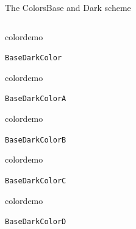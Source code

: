 \begin{frame}{The Colors}{Base and Dark scheme}
\begin{columns}
\begin{column}{0.45\textwidth}
\begin{beamercolorbox}[dp=0pt,sep=0em,wd=\bwidth,ht=\bheight]{}
\begin{beamercolorbox}[sep=0em,wd=\pdim,ht=\pdim]{colordemo}
\end{beamercolorbox}\quad\texttt{BaseDarkColor}\newline%
%
\begin{beamercolorbox}[sep=0em,wd=\pdim,ht=\pdim]{colordemo}
\end{beamercolorbox}\quad\texttt{BaseDarkColorA}\hfill\newline%
%
\begin{beamercolorbox}[sep=0em,wd=\pdim,ht=\pdim]{colordemo}%
\end{beamercolorbox}\quad\texttt{BaseDarkColorB}\hfill\newline%
%
\begin{beamercolorbox}[sep=0em,wd=\pdim,ht=\pdim]{colordemo}%
\end{beamercolorbox}\quad\texttt{BaseDarkColorC}\hfill\newline%
%
\begin{beamercolorbox}[sep=0em,wd=\pdim,ht=\pdim]{colordemo}%
\end{beamercolorbox}\quad\texttt{BaseDarkColorD}%
\end{beamercolorbox}%
\end{column}
\end{columns}
\end{frame}
%
%
%
%
%
